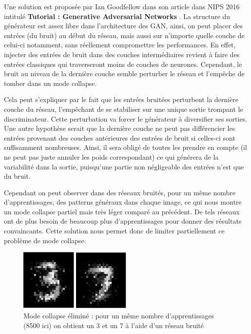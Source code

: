 Une solution est proposée par Ian Goodfellow dans son article dans NIPS 2016 intitulé \textbf{Tutorial : Generative Adversarial Networks} \cite{goodfellow_nips_2016}. La structure du générateur est assez libre dans l'architecture des GAN, ainsi, on peut placer des entrées (du bruit) au début du réseau, mais aussi sur n'importe quelle couche de celui-ci notamment, sans réellement compromettre les performances. En effet, injecter des entrées de bruit dans des couches intermédiaires revient à faire des entrées classiques qui traverseront moins de couches de neurones. Cependant, le bruit au niveau de la dernière couche semble perturber le réseau et l'empêche de tomber dans un mode collapse. 

Cela peut s'expliquer par le fait que les entrées bruitées perturbent la dernière couche du réseau, l'empêchant de se stabiliser sur une unique sortie trompant le discriminateur. Cette perturbation va forcer le générateur à diversifier ses sorties.
Une autre hypothèse serait que la dernière couche ne peut pas différencier les entrées provenant des couches antérieures des entrées de bruit si celles-ci sont suffisamment nombreuses. Ainsi, il sera obligé de toutes les prendre en compte (il ne peut pas juste annuler les poids correspondant) ce qui générera de la variabilité dans la sortie, puisqu'une partie non négligeable des entrées n'est que du bruit.

Cependant on peut observer dans des réseaux bruités, pour un même nombre d'apprentissages, des patterns généraux dans chaque image, ce qui nous montre un mode collapse partiel mais très léger comparé au précédent. De tels réseaux ont de plus besoin de beaucoup plus d'apprentissages pour donner des résultats convaincants. Cette solution nous permet donc de limiter partiellement ce problème de mode collapse.

\begin{figure}[h]
\begin{center}
\includegraphics[width=0.5\textwidth]{images/gan_bruite.png}\caption{Mode collapse éliminé : pour un même nombre d'apprentissages (8500 ici) on obtient un 3 et un 7 à l'aide d'un réseau bruité}
\end{center}
\end{figure}


